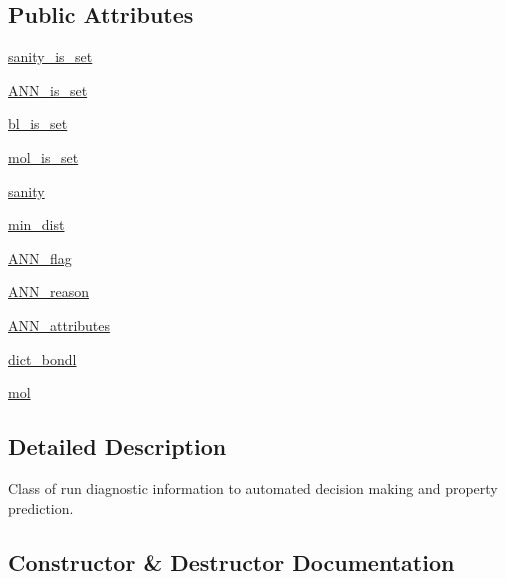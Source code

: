 \subsection*{Public Attributes}
\begin{DoxyCompactItemize}
\item 
\hyperlink{classmolSimplify_1_1Classes_1_1rundiag_1_1run__diag_a589e3d95a6d3b459b9d691f1489710ef}{sanity\+\_\+is\+\_\+set}
\item 
\hyperlink{classmolSimplify_1_1Classes_1_1rundiag_1_1run__diag_acbc5d5a67868d62ae0f3d9487816476e}{A\+N\+N\+\_\+is\+\_\+set}
\item 
\hyperlink{classmolSimplify_1_1Classes_1_1rundiag_1_1run__diag_a9169c98f4a082e5ba9a611dcd7f14dfe}{bl\+\_\+is\+\_\+set}
\item 
\hyperlink{classmolSimplify_1_1Classes_1_1rundiag_1_1run__diag_ac2ff49e58753e9a38fdce364e780c4e9}{mol\+\_\+is\+\_\+set}
\item 
\hyperlink{classmolSimplify_1_1Classes_1_1rundiag_1_1run__diag_a0ef07fdeafae0c40968a4b2cffc5ca33}{sanity}
\item 
\hyperlink{classmolSimplify_1_1Classes_1_1rundiag_1_1run__diag_a52afc50b5c44a45ae06443998f700691}{min\+\_\+dist}
\item 
\hyperlink{classmolSimplify_1_1Classes_1_1rundiag_1_1run__diag_ab77602b8de86bb282c07b2243f134590}{A\+N\+N\+\_\+flag}
\item 
\hyperlink{classmolSimplify_1_1Classes_1_1rundiag_1_1run__diag_a92f327be2e53727b00848e18f8427af9}{A\+N\+N\+\_\+reason}
\item 
\hyperlink{classmolSimplify_1_1Classes_1_1rundiag_1_1run__diag_a2188d3f122764860e545bbe18472255a}{A\+N\+N\+\_\+attributes}
\item 
\hyperlink{classmolSimplify_1_1Classes_1_1rundiag_1_1run__diag_ae47d840dc466b06e8d0d5495622acc08}{dict\+\_\+bondl}
\item 
\hyperlink{classmolSimplify_1_1Classes_1_1rundiag_1_1run__diag_a403fc5dcab3e50c5fec055bf9bbf6fb0}{mol}
\end{DoxyCompactItemize}


\subsection{Detailed Description}
Class of run diagnostic information to automated decision making and property prediction. 

\subsection{Constructor \& Destructor Documentation}
\mbox{\label{classmolSimplify_1_1Classes_1_1rundiag_1_1run__diag_a991e53c0bab164d1b921960f19597890}} 
